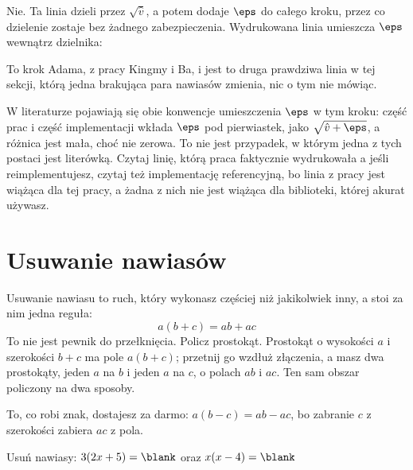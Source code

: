 \begin{fr}
\begin{ansblock}
Nie. Ta linia dzieli przez $\sqrt{\hat{v}}$, a potem dodaje $\eps$ do całego
kroku, przez co dzielenie zostaje bez żadnego zabezpieczenia. Wydrukowana linia
umieszcza $\eps$ wewnątrz dzielnika:
\begin{center}
\end{center}
\end{ansblock}

To krok Adama, z pracy Kingmy i Ba, i jest to druga prawdziwa linia w tej
sekcji, którą jedna brakująca para nawiasów zmienia, nic o tym nie mówiąc.

\begin{note}
W literaturze pojawiają się obie konwencje umieszczenia $\eps$ w tym kroku:
część prac i część implementacji wkłada $\eps$ pod pierwiastek, jako
$\sqrt{\hat{v} + \eps}$, a różnica jest mała, choć nie zerowa. To nie jest
przypadek, w którym jedna z tych postaci jest literówką. Czytaj linię, którą
praca faktycznie wydrukowała \dash{} a jeśli reimplementujesz, czytaj też
implementację referencyjną, bo linia z pracy jest wiążąca dla tej pracy, a
żadna z nich nie jest wiążąca dla biblioteki, której akurat używasz.
\end{note}
\end{fr}

\section{Usuwanie nawiasów}
\label{sec:F02-expanding}

\begin{fr}
Usuwanie nawiasu to ruch, który wykonasz częściej niż jakikolwiek inny, a stoi
za nim jedna reguła:
\[ a(b + c) = ab + ac \]
To nie jest pewnik do przełknięcia. Policz prostokąt. Prostokąt o wysokości $a$
i szerokości $b + c$ ma pole $a(b+c)$; przetnij go wzdłuż złączenia, a masz dwa
prostokąty, jeden $a$ na $b$ i jeden $a$ na $c$, o polach $ab$ i $ac$. Ten sam
obszar policzony na dwa sposoby.

To, co robi znak, dostajesz za darmo: $a(b - c) = ab - ac$, bo zabranie $c$ z
szerokości zabiera $ac$ z pola.

Usuń nawiasy: $3(2x + 5) = \blank$ oraz $x(x - 4) = \blank$
\dotline
\nextframe
\end{fr}

